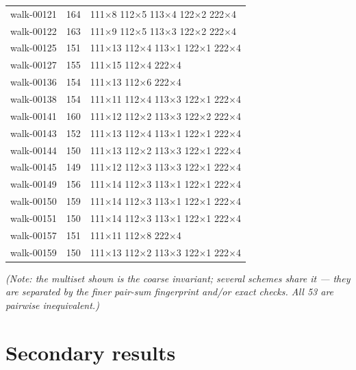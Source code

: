 \documentclass[10pt]{article}
\begin{document}
{\begin{longtable}{@{}l r l@{}}
walk-00121 & 164 & 111\(\times\)8 112\(\times\)5 113\(\times\)4 122\(\times\)2 222\(\times\)4 \\
walk-00122 & 163 & 111\(\times\)9 112\(\times\)5 113\(\times\)3 122\(\times\)2 222\(\times\)4 \\
walk-00125 & 151 & 111\(\times\)13 112\(\times\)4 113\(\times\)1 122\(\times\)1 222\(\times\)4 \\
walk-00127 & 155 & 111\(\times\)15 112\(\times\)4 222\(\times\)4 \\
walk-00136 & 154 & 111\(\times\)13 112\(\times\)6 222\(\times\)4 \\
walk-00138 & 154 & 111\(\times\)11 112\(\times\)4 113\(\times\)3 122\(\times\)1 222\(\times\)4 \\
walk-00141 & 160 & 111\(\times\)12 112\(\times\)2 113\(\times\)3 122\(\times\)2 222\(\times\)4 \\
walk-00143 & 152 & 111\(\times\)13 112\(\times\)4 113\(\times\)1 122\(\times\)1 222\(\times\)4 \\
walk-00144 & 150 & 111\(\times\)13 112\(\times\)2 113\(\times\)3 122\(\times\)1 222\(\times\)4 \\
walk-00145 & 149 & 111\(\times\)12 112\(\times\)3 113\(\times\)3 122\(\times\)1 222\(\times\)4 \\
walk-00149 & 156 & 111\(\times\)14 112\(\times\)3 113\(\times\)1 122\(\times\)1 222\(\times\)4 \\
walk-00150 & 159 & 111\(\times\)14 112\(\times\)3 113\(\times\)1 122\(\times\)1 222\(\times\)4 \\
walk-00151 & 150 & 111\(\times\)14 112\(\times\)3 113\(\times\)1 122\(\times\)1 222\(\times\)4 \\
walk-00157 & 151 & 111\(\times\)11 112\(\times\)8 222\(\times\)4 \\
walk-00159 & 150 & 111\(\times\)13 112\(\times\)2 113\(\times\)3 122\(\times\)1 222\(\times\)4 \\
\end{longtable}
}

\emph{(Note: the multiset shown is the coarse invariant; several
schemes share it --- they are separated by the finer pair-sum
fingerprint and/or exact checks. All 53 are pairwise inequivalent.)}

\section{Secondary results}\label{sec:secondary}
\end{document}
